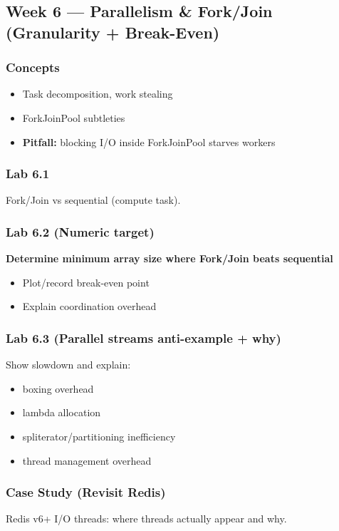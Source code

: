 \documentclass[11pt,a4paper]{article}
\begin{document}
	\subsection*{Week 6 --- Parallelism \& Fork/Join (Granularity + Break-Even)}
	
	\subsubsection*{Concepts}
	\begin{itemize}[leftmargin=*]
		\item Task decomposition, work stealing
		\item ForkJoinPool subtleties
		\item \textbf{Pitfall:} blocking I/O inside ForkJoinPool starves workers
	\end{itemize}
	
	\subsubsection*{Lab 6.1}
	Fork/Join vs sequential (compute task).
	
	\subsubsection*{Lab 6.2 (Numeric target)}
	\textbf{Determine minimum array size where Fork/Join beats sequential}
	\begin{itemize}[leftmargin=*]
		\item Plot/record break-even point
		\item Explain coordination overhead
	\end{itemize}
	
	\subsubsection*{Lab 6.3 (Parallel streams anti-example + why)}
	Show slowdown and explain:
	\begin{itemize}[leftmargin=*]
		\item boxing overhead
		\item lambda allocation
		\item spliterator/partitioning inefficiency
		\item thread management overhead
	\end{itemize}
	
	\subsubsection*{Case Study (Revisit Redis)}
	Redis v6+ I/O threads: where threads actually appear and why.
	
\end{document}
